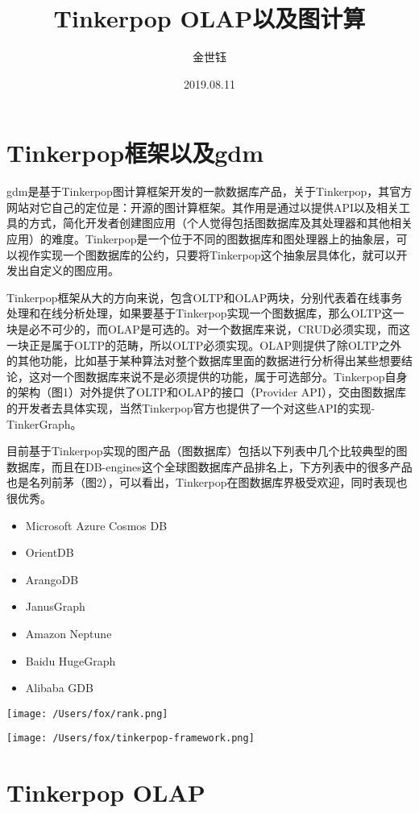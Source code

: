 \documentclass{article}
\title{Tinkerpop OLAP以及图计算}
\author{金世钰}
\date{2019.08.11}
\begin{document}
\maketitle
\section{Tinkerpop框架以及gdm}

gdm是基于Tinkerpop图计算框架开发的一款数据库产品，关于Tinkerpop，其官方网站对它自己的定位是：开源的图计算框架。其作用是通过以提供API以及相关工具的方式，简化开发者创建图应用（个人觉得包括图数据库及其处理器和其他相关应用）的难度。Tinkerpop是一个位于不同的图数据库和图处理器上的抽象层，可以视作实现一个图数据库的公约，只要将Tinkerpop这个抽象层具体化，就可以开发出自定义的图应用。

Tinkerpop框架从大的方向来说，包含OLTP和OLAP两块，分别代表着在线事务处理和在线分析处理，如果要基于Tinkerpop实现一个图数据库，那么OLTP这一块是必不可少的，而OLAP是可选的。对一个数据库来说，CRUD必须实现，而这一块正是属于OLTP的范畴，所以OLTP必须实现。OLAP则提供了除OLTP之外的其他功能，比如基于某种算法对整个数据库里面的数据进行分析得出某些想要结论，这对一个图数据库来说不是必须提供的功能，属于可选部分。Tinkerpop自身的架构（图1）对外提供了OLTP和OLAP的接口（Provider API），交由图数据库的开发者去具体实现，当然Tinkerpop官方也提供了一个对这些API的实现-TinkerGraph。

目前基于Tinkerpop实现的图产品（图数据库）包括以下列表中几个比较典型的图数据库，而且在DB-engines这个全球图数据库产品排名上，下方列表中的很多产品也是名列前茅（图2），可以看出，Tinkerpop在图数据库界极受欢迎，同时表现也很优秀。

\begin{itemize}

\item Microsoft Azure Cosmos DB
\item OrientDB
\item ArangoDB
\item JanusGraph
\item Amazon Neptune
\item Baidu HugeGraph
\item Alibaba GDB
\end{itemize}

\texttt{[image: /Users/fox/rank.png]}


\texttt{[image: /Users/fox/tinkerpop-framework.png]}

\section{Tinkerpop OLAP}
\end{document}
